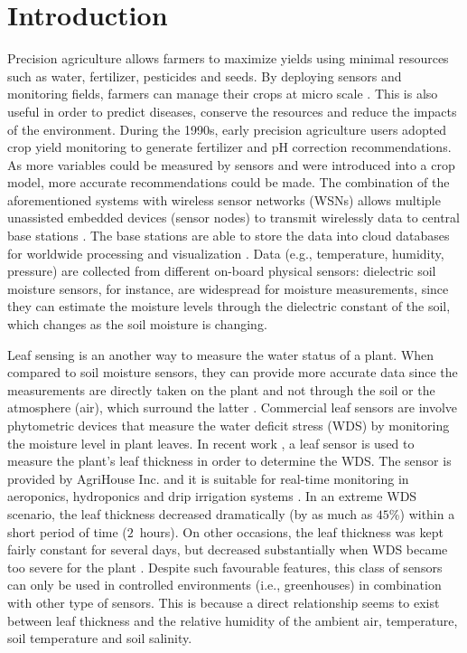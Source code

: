 \documentclass[journal]{IEEEtran}
\begin{document}
\section{Introduction}
\label{sec:intro}
Precision agriculture allows farmers to maximize yields using minimal resources such as water, fertilizer, pesticides and seeds. 
%
By deploying sensors and monitoring fields, farmers can manage their crops at micro scale  \cite{ivanov2015precision}.
% 
This is also useful in order to predict diseases, conserve the resources and reduce the impacts of the environment. 
%
%
%
During the 1990s, early precision agriculture users adopted crop yield monitoring to generate fertilizer and pH correction recommendations. 
%
As more variables could be measured by sensors and were introduced into a crop model, more accurate recommendations could be made.
%
The combination of the aforementioned systems with wireless sensor networks (WSNs) allows multiple unassisted embedded devices (sensor nodes) to transmit  wirelessly data to central base stations \cite{ruiz2009review, yu2009zigbee}.
%
The base stations are able to store the data into cloud databases
for worldwide processing and visualization  \cite{fahmi2017prototype}. 
% 
Data (e.g., temperature, humidity, pressure) are collected from different on-board physical sensors: dielectric soil moisture sensors, for instance,  are widespread  for moisture measurements, since they can estimate the moisture levels through the dielectric constant of the soil, which changes as the soil moisture is changing.

%
Leaf sensing is an another way to measure the water status of a plant. 
%
When compared to soil moisture sensors, they can provide more accurate data since the measurements are directly taken on the plant and not through the soil or the atmosphere (air), which surround the latter \cite{palazzari2017leaf}. 
%
Commercial   leaf sensors  are involve   phytometric devices  that measure  the water deficit stress (WDS) by monitoring the moisture level in plant leaves. 
%
In recent work \cite{seelig2012irrigation}, a leaf sensor is used to measure the plant's leaf thickness in order to determine the WDS.
%
The  sensor is provided by  AgriHouse Inc.  and it is suitable for  real-time monitoring in  aeroponics, hydroponics and drip irrigation systems \cite{SG-1000}.
%
In an extreme WDS scenario, the leaf thickness decreased dramatically (by as much as $45$\%) within a short period of time ($2$~hours). 
%
On other occasions, the leaf thickness was kept fairly constant for several days, but decreased substantially when WDS became too severe for the plant \cite{seelig2012irrigation}.
%
Despite such favourable features, this class of sensors can only be used  in controlled environments (i.e., greenhouses) in  combination with other type of  sensors.
%
This is because a direct relationship seems to exist between leaf thickness and the relative humidity of the ambient air, temperature, soil temperature and soil salinity\cite{seelig2012irrigation}.  
%
\end{document}
